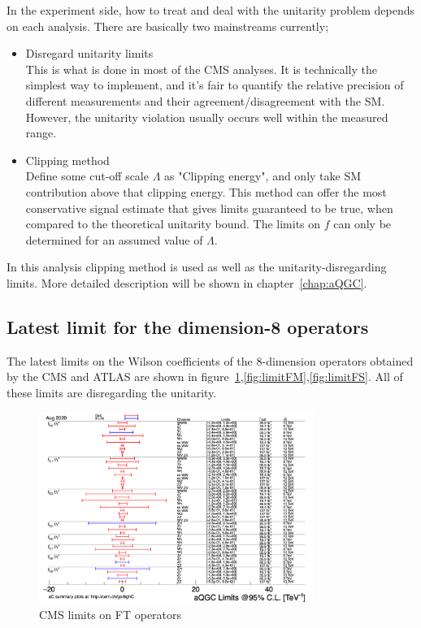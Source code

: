 In the experiment side, how to treat and deal with the unitarity problem depends on each analysis. 
There are basically two mainstreams currently;
\begin{itemize}
    \item Disregard unitarity limits \\
    This is what is done in most of the CMS analyses. It is technically the simplest way to implement, and it's fair to quantify the relative precision of different measurements and their agreement/disagreement with the SM. However, the unitarity violation usually occurs well within the measured range.
    \item Clipping method \\
    Define some cut-off scale $\Lambda$ as "Clipping energy", and only take SM contribution above that clipping energy. This method can offer the most conservative signal estimate that gives limits guaranteed to be true, when compared to the theoretical unitarity bound. 
    The limits on $f$ can only be determined for an assumed value of $\Lambda$.
\end{itemize}
In this analysis clipping method is used as well as the unitarity-disregarding limits. 
More detailed description will be shown in chapter~\ref{chap:aQGC}.

\subsection{Latest limit for the dimension-8 operators}
The latest limits on the Wilson coefficients of the 8-dimension operators obtained by the CMS and ATLAS are shown in figure~\ref{fig:limitFT},\ref{fig:limitFM},\ref{fig:limitFS}. All of these limits are disregarding the unitarity.
\begin{figure}[tbp]
\begin{center}
 \includegraphics[width=0.80\textwidth,keepaspectratio]{figures/aQGC/aQGC_ft.png}
\caption{CMS limits on FT operators}
\label{fig:limitFT}
\end{center}
\end{figure}

